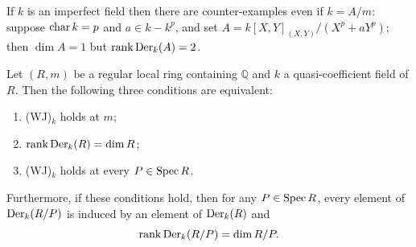 \begin{remark}
If $k$ is an imperfect field then there are counter-examples even if
$k = A/m$: suppose $\operatorname{char} k = p$ and $a \in k - k^p$, and set
$A = k[X, Y]_{(X, Y)}/(X^p + aY^p)$; then $\dim A = 1$ but
$\operatorname{rank} \operatorname{Der}_k(A) = 2$.
\end{remark}

\begin{theorem}\label{thm:30.8}
Let $(R, m)$ be a regular local ring containing $\mathbb{Q}$ and $k$ a quasi-coefficient
field of $R$. Then the following three conditions are equivalent:
\begin{enumerate}[(1)]
  \item (WJ)$_k$ holds at $m$;
  \item $\operatorname{rank} \operatorname{Der}_k(R) = \dim R$;
  \item (WJ)$_k$ holds at every $P \in \operatorname{Spec} R$.
\end{enumerate}
Furthermore, if these conditions hold, then for any $P \in \operatorname{Spec} R$, every element
of $\operatorname{Der}_k(R/P)$ is induced by an element of $\operatorname{Der}_k(R)$ and
\[
  \operatorname{rank} \operatorname{Der}_k(R/P) = \dim R/P.
\]
\end{theorem}

